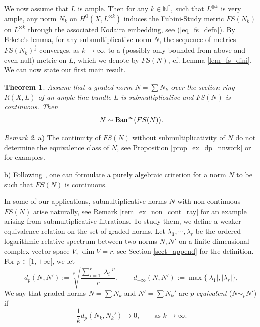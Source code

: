 \documentclass[12pt]{article}
\numberwithin{equation}{section}
\theoremstyle{theorem}
\newtheorem{thm}{Theorem}[section]
\theoremstyle{definition}
\theoremstyle{remark}
\newtheorem{rem}[thm]{Remark}
\newcommand{\nat}{\mathbb{N}}
\begin{document}
	\par 
	We now assume that $L$ is ample. 
	Then for any $k \in \nat^*$, such that $L^{\otimes k}$ is very ample, any norm $N_k$ on $H^0(X, L^{\otimes k})$ induces the Fubini-Study metric $FS(N_k)$ on $L^{\otimes k}$ through the associated Kodaira embedding, see (\ref{eq_fs_defn}).
	By Fekete's lemma, for any submultiplicative norm $N$, the sequence of metrics $FS(N_k)^{\frac{1}{k}}$ converges, as $k \to \infty$, to a (possibly only bounded from above and even null) metric on $L$, which we denote by $FS(N)$, cf. Lemma \ref{lem_fs_dini}. 
	We can now state our first main result.
	\begin{thm}\label{thm_char}
		Assume that a graded norm $N = \sum N_k$ over the section ring $R(X, L)$ of an ample line bundle $L$ is submultiplicative and $FS(N)$ is continuous.
		Then 
		\begin{equation}\label{eq_char}
			N \sim {\rm{Ban}}^{\infty}(FS(N)).
		\end{equation}
	\end{thm}
	\begin{rem}
		a)
		The continuity of $FS(N)$ without submultiplicativity of $N$ do not determine the equivalence class of $N$, see Proposition \ref{prop_ex_dp_nnwork} or \cite[Proposition 4.16]{FinSecRing} for examples.
		\par 
		b)
		Following \cite[Definition 1.3]{FinSecRing}, one can formulate a purely algebraic criterion for a norm $N$ to be such that $FS(N)$ is continuous.
	\end{rem}
	\par
	In some of our applications, submultiplicative norms $N$ with non-continuous $FS(N)$ arise naturally, see Remark \ref{rem_ex_non_cont_ray} for an example arising from submultiplicative filtrations. 
	To study them, we define a weaker equivalence relation on the set of graded norms.
	Let $\lambda_1, \cdots, \lambda_r$ be the ordered logarithmic relative spectrum between two norms $N, N'$ on a finite dimensional complex vector space $V$, $\dim V = r$, see Section \ref{sect_append} for the definition.
	For $p \in [1, + \infty[$, we let
	\begin{equation}\label{eq_dp_defn_norms}
		d_p(N, N') := \sqrt[p]{\frac{\sum_{i = 1}^{r} |\lambda_i|^p}{r}},
		\qquad 
		d_{+ \infty}(N, N') := \max \big\{ |\lambda_1|, |\lambda_r| \big\},
	\end{equation}
	We say that graded norms $N = \sum N_k$ and $N' = \sum N_k'$ are $p$-\textit{equivalent} ($N \sim_p N'$) if 
 	\begin{equation}\label{defn_equiv_relp}
		\frac{1}{k} d_p(N_k, N_k') \to 0, \qquad \text{as } k \to \infty.
	\end{equation}
\end{document}
